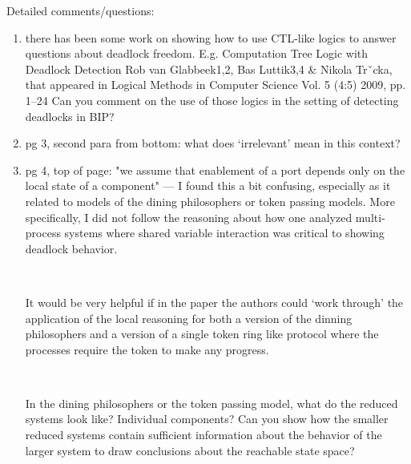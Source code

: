 Detailed comments/questions:
\begin{enumerate}

\item there has been some work on showing how to use CTL-like logics to answer
questions about deadlock freedom.  E.g.
  Computation Tree Logic with Deadlock Detection
  Rob van Glabbeek1,2, Bas Luttik3,4 \& Nikola Trˇcka, that appeared in
  Logical Methods in Computer Science
  Vol. 5 (4:5) 2009, pp. 1–24
Can you comment on the use of those logics in the setting of detecting deadlocks in
BIP?


\item  pg 3, second para from bottom: what does `irrelevant' mean in this context?


\item pg 4, top of page: "we assume that enablement of a port depends only on the
local state of a component" --- I found this a bit confusing, especially as it related
to models of the dining philosophers or token passing models.  More specifically, I
did not follow the reasoning about how one analyzed multi-process systems
where shared variable interaction was critical to showing deadlock behavior.

~

It would be very helpful if in the paper the authors could `work through' the application
of the local reasoning for both a version of the dinning philosophers and a version
of a single token ring like protocol where the processes require the token to make
any progress.

~

 In the dining philosophers or the token passing model, what do the reduced systems
look like? Individual components?  Can you show how the smaller reduced systems
contain sufficient information about the behavior of the larger system to draw conclusions
about the reachable state space?

~




\end{enumerate}
